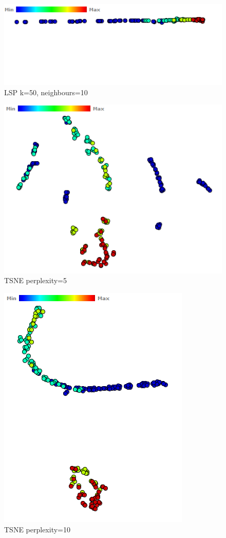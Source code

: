 \documentclass[ 10pt ]{fphw}
\begin{document}
\begin{center}
\begin{figure}[H]
    \centering
	\includegraphics[width=0.65\columnwidth]{hdiProj/hdiLSP-50-10.PNG}
	\caption{LSP k=50, neighbours=10}
	\label{fig:hdiLSP-50-10}
	\end{figure}
\end{center}

\begin{center}
\begin{figure}[H]
    \centering
	\includegraphics[width=0.65\columnwidth]{hdiProj/hdiTSNE-5.PNG}
	\caption{TSNE perplexity=5}
	\label{fig:hdiTSNE5}
	\end{figure}
\end{center}

\begin{center}
\begin{figure}[H]
    \centering
	\includegraphics[width=0.45\columnwidth]{hdiProj/hdiTSNE-10.PNG}
	\caption{TSNE perplexity=10}
	\label{fig:hdiTSNE10}
	\end{figure}
\end{center}
\end{document}

